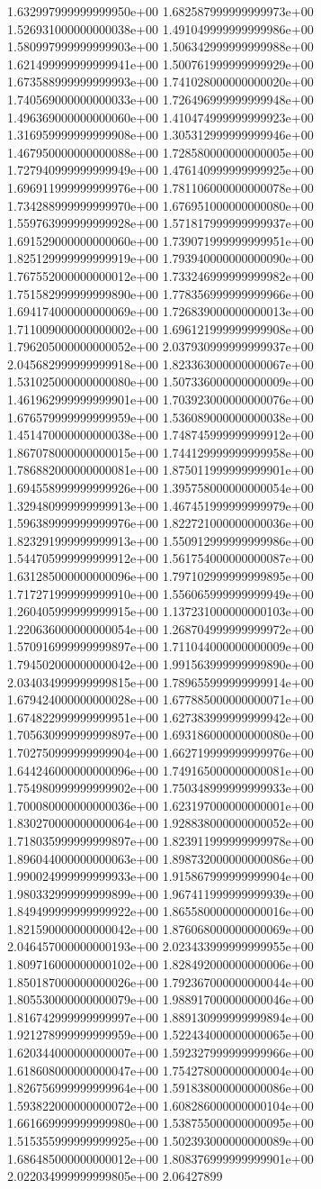 	1.632997999999999950e+00	1.682587999999999973e+00	1.526931000000000038e+00	1.491049999999999986e+00	1.580997999999999903e+00	1.506342999999999988e+00	1.621499999999999941e+00	1.500761999999999929e+00	1.673588999999999993e+00	1.741028000000000020e+00	1.740569000000000033e+00	1.726496999999999948e+00	1.496369000000000060e+00	1.410474999999999923e+00	1.316959999999999908e+00	1.305312999999999946e+00	1.467950000000000088e+00	1.728580000000000005e+00	1.727940999999999949e+00	1.476140999999999925e+00	1.696911999999999976e+00	1.781106000000000078e+00	1.734288999999999970e+00	1.676951000000000080e+00	1.559763999999999928e+00	1.571817999999999937e+00	1.691529000000000060e+00	1.739071999999999951e+00	1.825129999999999919e+00	1.793940000000000090e+00	1.767552000000000012e+00	1.733246999999999982e+00	1.751582999999999890e+00	1.778356999999999966e+00	1.694174000000000069e+00	1.726839000000000013e+00	1.711009000000000002e+00	1.696121999999999908e+00	1.796205000000000052e+00	2.037930999999999937e+00	2.045682999999999918e+00	1.823363000000000067e+00	1.531025000000000080e+00	1.507336000000000009e+00	1.461962999999999901e+00	1.703923000000000076e+00	1.676579999999999959e+00	1.536089000000000038e+00	1.451470000000000038e+00	1.748745999999999912e+00	1.867078000000000015e+00	1.744129999999999958e+00	1.786882000000000081e+00	1.875011999999999901e+00	1.694558999999999926e+00	1.395758000000000054e+00	1.329480999999999913e+00	1.467451999999999979e+00	1.596389999999999976e+00	1.822721000000000036e+00	1.823291999999999913e+00	1.550912999999999986e+00	1.544705999999999912e+00	1.561754000000000087e+00	1.631285000000000096e+00	1.797102999999999895e+00	1.717271999999999910e+00	1.556065999999999949e+00	1.260405999999999915e+00	1.137231000000000103e+00	1.220636000000000054e+00	1.268704999999999972e+00	1.570916999999999897e+00	1.711044000000000009e+00	1.794502000000000042e+00	1.991563999999999890e+00	2.034034999999999815e+00	1.789655999999999914e+00	1.679424000000000028e+00	1.677885000000000071e+00	1.674822999999999951e+00	1.627383999999999942e+00	1.705630999999999897e+00	1.693186000000000080e+00	1.702750999999999904e+00	1.662719999999999976e+00	1.644246000000000096e+00	1.749165000000000081e+00	1.754980999999999902e+00	1.750348999999999933e+00	1.700080000000000036e+00	1.623197000000000001e+00	1.830270000000000064e+00	1.928838000000000052e+00	1.718035999999999897e+00	1.823911999999999978e+00	1.896044000000000063e+00	1.898732000000000086e+00	1.990024999999999933e+00	1.915867999999999904e+00	1.980332999999999899e+00	1.967411999999999939e+00	1.849499999999999922e+00	1.865580000000000016e+00	1.821590000000000042e+00	1.876068000000000069e+00	2.046457000000000193e+00	2.023433999999999955e+00	1.809716000000000102e+00	1.828492000000000006e+00	1.850187000000000026e+00	1.792367000000000044e+00	1.805530000000000079e+00	1.988917000000000046e+00	1.816742999999999997e+00	1.889130999999999894e+00	1.921278999999999959e+00	1.522434000000000065e+00	1.620344000000000007e+00	1.592327999999999966e+00	1.618608000000000047e+00	1.754278000000000004e+00	1.826756999999999964e+00	1.591838000000000086e+00	1.593822000000000072e+00	1.608286000000000104e+00	1.661669999999999980e+00	1.538755000000000095e+00	1.515355999999999925e+00	1.502393000000000089e+00	1.686485000000000012e+00	1.808376999999999901e+00	2.022034999999999805e+00	2.06427899